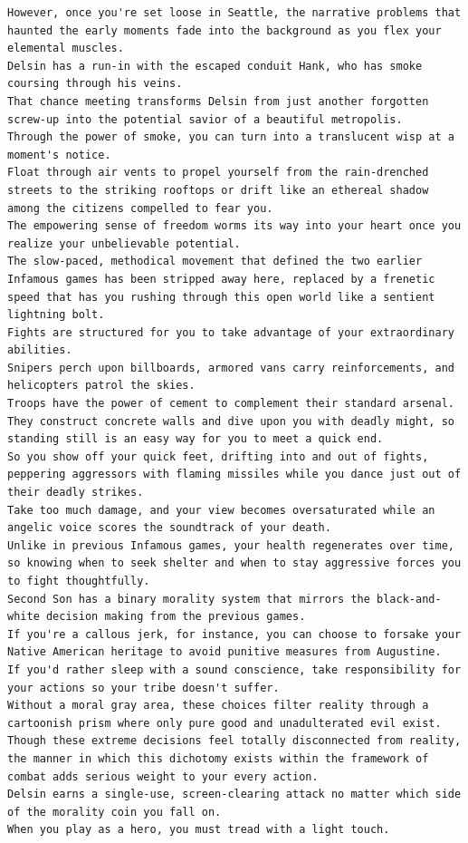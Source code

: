 \documentclass[BTech]{nitgoathesis}
\begin{document}
\begin{lstlisting}[basicstyle=\scriptsize]
However, once you're set loose in Seattle, the narrative problems that haunted the early moments fade into the background as you flex your elemental muscles.
Delsin has a run-in with the escaped conduit Hank, who has smoke coursing through his veins.
That chance meeting transforms Delsin from just another forgotten screw-up into the potential savior of a beautiful metropolis.
Through the power of smoke, you can turn into a translucent wisp at a moment's notice.
Float through air vents to propel yourself from the rain-drenched streets to the striking rooftops or drift like an ethereal shadow among the citizens compelled to fear you.
The empowering sense of freedom worms its way into your heart once you realize your unbelievable potential.
The slow-paced, methodical movement that defined the two earlier Infamous games has been stripped away here, replaced by a frenetic speed that has you rushing through this open world like a sentient lightning bolt.
Fights are structured for you to take advantage of your extraordinary abilities.
Snipers perch upon billboards, armored vans carry reinforcements, and helicopters patrol the skies.
Troops have the power of cement to complement their standard arsenal.
They construct concrete walls and dive upon you with deadly might, so standing still is an easy way for you to meet a quick end.
So you show off your quick feet, drifting into and out of fights, peppering aggressors with flaming missiles while you dance just out of their deadly strikes.
Take too much damage, and your view becomes oversaturated while an angelic voice scores the soundtrack of your death.
Unlike in previous Infamous games, your health regenerates over time, so knowing when to seek shelter and when to stay aggressive forces you to fight thoughtfully.
Second Son has a binary morality system that mirrors the black-and-white decision making from the previous games.
If you're a callous jerk, for instance, you can choose to forsake your Native American heritage to avoid punitive measures from Augustine.
If you'd rather sleep with a sound conscience, take responsibility for your actions so your tribe doesn't suffer.
Without a moral gray area, these choices filter reality through a cartoonish prism where only pure good and unadulterated evil exist.
Though these extreme decisions feel totally disconnected from reality, the manner in which this dichotomy exists within the framework of combat adds serious weight to your every action.
Delsin earns a single-use, screen-clearing attack no matter which side of the morality coin you fall on.
When you play as a hero, you must tread with a light touch.

\end{lstlisting}
\end{document}

